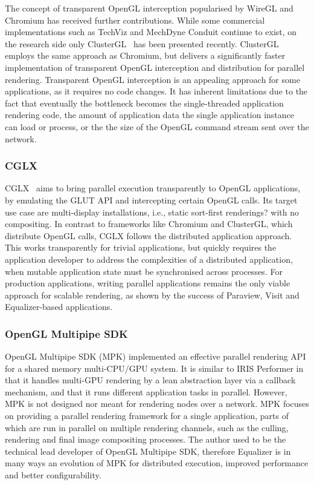 The concept of transparent OpenGL interception popularised by WireGL and
Chromium has received further contributions. While some commercial
implementations such as {TechViz} and {MechDyne Conduit} continue to exist, on
the research side only {ClusterGL}~\cite{NHM:11} has been presented recently.
{ClusterGL} employs the same approach as {Chromium}, but delivers a
significantly faster implementation of transparent OpenGL interception and
distribution for parallel rendering. Transparent OpenGL interception is an
appealing approach for some applications, as it requires no code changes.
It has inherent limitations due to the fact that eventually the bottleneck
becomes the single-threaded application rendering code, the amount of
application data the single application instance can load or process, or the the
size of the OpenGL command stream sent over the network.

\subsubsection{CGLX}

{CGLX}~\cite{DK:11} aims to bring parallel execution transparently to OpenGL
applications, by emulating the GLUT API and intercepting certain OpenGL calls.
Its target use case are multi-display installations, i.e., static sort-first
renderings? with no compositing. In contrast to frameworks like {Chromium} and
{ClusterGL}, which distribute OpenGL calls, {CGLX} follows the distributed
application approach. This works transparently for trivial applications, but
quickly requires the application developer to address the complexities of a
distributed application, when mutable application state must be
synchronised across processes. For production applications, writing parallel
applications remains the only viable approach for scalable rendering, as shown
by the success of {Paraview}, {Visit} and {Equalizer}-based applications.

\subsubsection{OpenGL Multipipe SDK}

OpenGL Multipipe SDK (MPK) \cite{BRE:05} implemented an effective parallel
rendering API for a shared memory multi-CPU/GPU system. It is similar to IRIS
Performer \cite{RH:94} in that it handles multi-GPU rendering by a lean
abstraction layer via a callback mechanism, and that it runs
different application tasks in parallel. However, MPK is not designed nor meant
for rendering nodes over a network. MPK focuses on providing a parallel
rendering framework for a single application, parts of which are run in
parallel on multiple rendering channels, such as the culling, rendering and
final image compositing processes. The author used to be the technical lead
developer of OpenGL Multipipe SDK, therefore Equalizer is in many ways an
evolution of MPK for distributed execution, improved performance and better
configurability.


